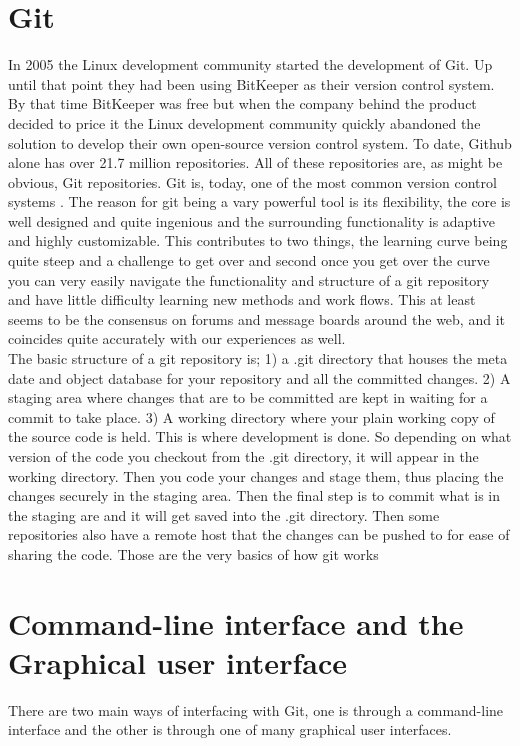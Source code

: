 \documentclass[a4paper,oneside]{bth} %
\begin{document}
			\section{Git}
			In 2005 the Linux development community started the development of Git.
			Up until that point they had been using BitKeeper as their version control system. By that time BitKeeper was free but when the company behind the product decided to price it the Linux development community quickly abandoned the solution to develop their own open-source version control system.\cite{ProGit}
			To date, Github alone has over 21.7 million repositories.\cite{GithubAbout} All of these repositories are, as might be obvious, Git repositories. 
			Git is, today, one of the most common version control systems \cite{EclipseDeveoperReport}\cite{DeveloperProductivity}\cite{MicrosoftSurveyResults}. The reason for git being a vary powerful tool is its flexibility, the core is well designed and quite ingenious and the surrounding functionality is adaptive and highly customizable. This contributes to two things, the learning curve being quite steep and a challenge to get over and second once you get over the curve you can very easily navigate the functionality and structure of a git repository and have little difficulty learning new methods and work flows. This at least seems to be the consensus on forums and message boards around the web, and it coincides quite accurately with our experiences as well.
			\\
			The basic structure of a git repository is; 1) a .git directory that houses the meta date and object database for your repository and all the committed changes. 2) A staging area where changes that are to be committed are kept in waiting for a commit to take place. 3) A working directory where your plain working copy of the source code is held. This is where development is done. \cite{GitStructure} 
			So depending on what version of the code you checkout from the .git directory, it will appear in the working directory. Then you code your changes and stage them, thus placing the changes securely in the staging area. Then the final step is to commit what is in the staging are and it will get saved into the .git directory. Then some repositories also have a remote host that the changes can be pushed to for ease of sharing the code. Those are the very basics of how git works \cite{GitStructure}
			
			\section{Command-line interface and the Graphical user interface}
			There are two main ways of interfacing with Git, one is through a command-line interface and the other is through one of many graphical user interfaces. \cite{GitGUIs}\\
			
\end{document}
